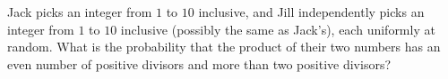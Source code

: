 Jack picks an integer from $1$ to $10$ inclusive, and Jill independently picks an integer from $1$ to $10$ inclusive (possibly the same as Jack's), each uniformly at random. What is the probability that the product of their two numbers has an even number of positive divisors and more than two positive divisors?

